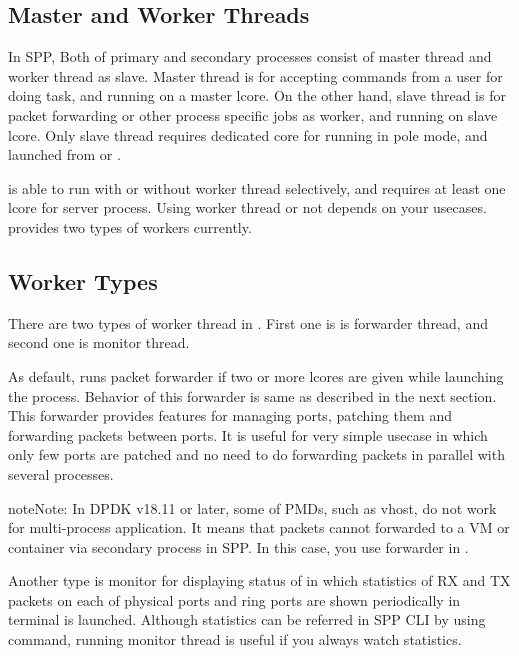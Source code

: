 \documentclass[a4paper,11pt,openany,oneside,english]{sphinxmanual}
\begin{document}
\subsection{Master and Worker Threads}
\label{\detokenize{design/spp_primary:master-and-worker-threads}}
In SPP, Both of primary and secondary processes consist of master thread and
worker thread as slave. Master thread is for accepting commands from a user
for doing task, and running on a master lcore. On the other hand,
slave thread is for packet forwarding or other process specific jobs
as worker, and running on slave lcore. Only slave thread requires
dedicated core for running in pole mode, and launched from
 or .

 is able to run with or without worker thread selectively,
and requires at least one lcore for server process.
Using worker thread or not depends on your usecases.
 provides two types of workers currently.


\subsection{Worker Types}
\label{\detokenize{design/spp_primary:worker-types}}
There are two types of worker thread in . First one is
is forwarder thread, and second one is monitor thread.

As default,  runs packet forwarder if two or more lcores
are given while launching the process. Behavior of this forwarder is
same as  described in the next section.
This forwarder provides features for managing ports, patching them and
forwarding packets between ports.
It is useful for very simple usecase in which only few ports are patched
and no need to do forwarding packets in parallel with several processes.

\begin{sphinxadmonition}{note}{Note:}
In DPDK v18.11 or later, some of PMDs, such as vhost, do not work for
multi-process application. It means that packets cannot forwarded
to a VM or container via secondary process in SPP.
In this case, you use forwarder in .
\end{sphinxadmonition}

Another type is monitor for displaying status of  in which
statistics of RX and TX packets on each of physical ports and ring ports
are shown periodically in terminal  is launched.
Although statistics can be referred in SPP CLI by using 
command, running monitor thread is useful if you always watch statistics.
\end{document}
